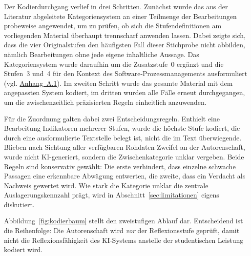 Der Kodierdurchgang verlief in drei Schritten. Zunächst wurde das aus der Literatur abgeleitete
Kategoriensystem an einer Teilmenge der Bearbeitungen probeweise angewendet, um zu prüfen, ob sich die
Stufendefinitionen am vorliegenden Material überhaupt trennscharf anwenden lassen. Dabei zeigte sich,
dass die vier Originalstufen den häufigsten Fall dieser Stichprobe nicht abbilden, nämlich
Bearbeitungen ohne jede eigene inhaltliche Aussage. Das Kategoriensystem wurde daraufhin um die
Zusatzstufe~0 ergänzt und die Stufen~3 und~4 für den Kontext des Software-Prozessmanagements
ausformuliert (vgl. \hyperref[app:kategoriensystem]{Anhang~A.1}). Im zweiten Schritt wurde das
gesamte Material mit dem angepassten System kodiert, im dritten wurden alle Fälle erneut
durchgegangen, um die zwischenzeitlich präzisierten Regeln einheitlich anzuwenden.

Für die Zuordnung galten dabei zwei Entscheidungsregeln. Enthielt eine Bearbeitung Indikatoren
mehrerer Stufen, wurde die höchste Stufe kodiert, die durch eine ausformulierte Textstelle belegt
ist, nicht die im Text überwiegende. Blieben nach Sichtung aller verfügbaren Rohdaten Zweifel an der
Autorenschaft, wurde nicht \glqq KI-generiert\grqq{}, sondern die Zwischenkategorie \glqq
unklar\grqq{} vergeben. Beide Regeln sind konservativ gewählt: Die erste verhindert, dass einzelne
schwache Passagen eine erkennbare Abwägung entwerten, die zweite, dass ein Verdacht als Nachweis
gewertet wird. Wie stark die Kategorie \glqq unklar\grqq{} die zentrale Auslagerungskennzahl prägt,
wird in Abschnitt~\ref{sec:limitationen} eigens diskutiert.

Abbildung~\ref{fig:kodierbaum} stellt den zweistufigen Ablauf dar. Entscheidend ist die Reihenfolge:
Die Autorenschaft wird \emph{vor} der Reflexionsstufe geprüft, damit nicht die Reflexionsfähigkeit des
KI-Systems anstelle der studentischen Leistung kodiert wird.

